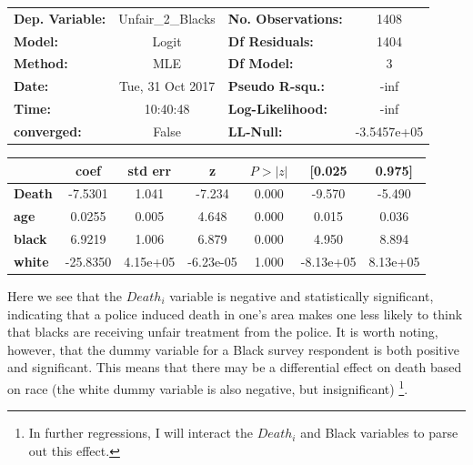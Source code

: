 \documentclass{article}
\begin{document}
\begin{tabular}{lclc}
\toprule
\textbf{Dep. Variable:} & Unfair\_2\_Blacks  & \textbf{  No. Observations:  } &      1408    \\
\textbf{Model:}         &      Logit       & \textbf{  Df Residuals:      } &      1404    \\
\textbf{Method:}        &       MLE        & \textbf{  Df Model:          } &         3    \\
\textbf{Date:}          & Tue, 31 Oct 2017 & \textbf{  Pseudo R-squ.:     } &      -inf    \\
\textbf{Time:}          &     10:40:48     & \textbf{  Log-Likelihood:    } &       -inf   \\
\textbf{converged:}     &      False       & \textbf{  LL-Null:           } & -3.5457e+05  \\
\bottomrule
\end{tabular}
\begin{tabular}{lcccccc}
               & \textbf{coef} & \textbf{std err} & \textbf{z} & \textbf{$P>|z|$} & \textbf{[0.025} & \textbf{0.975]}  \\
\midrule
\textbf{Death} &      -7.5301  &        1.041     &    -7.234  &         0.000        &       -9.570    &       -5.490     \\
\textbf{age}   &       0.0255  &        0.005     &     4.648  &         0.000        &        0.015    &        0.036     \\
\textbf{black} &       6.9219  &        1.006     &     6.879  &         0.000        &        4.950    &        8.894     \\
\textbf{white} &     -25.8350  &     4.15e+05     & -6.23e-05  &         1.000        &    -8.13e+05    &     8.13e+05     \\
\bottomrule
\end{tabular}

\bigskip

Here we see that the $Death_{i}$ variable is negative and statistically significant, indicating that a police induced death in one's area makes one less likely to think that blacks are receiving unfair treatment from the police. It is worth noting, however, that the dummy variable for a Black survey respondent is both positive and significant. This means that there may be a differential effect on death based on race (the white dummy variable is also negative, but insignificant) \footnote{In further regressions, I will interact the  $Death_{i}$ and Black variables to parse out this effect.}.
\end{document}
